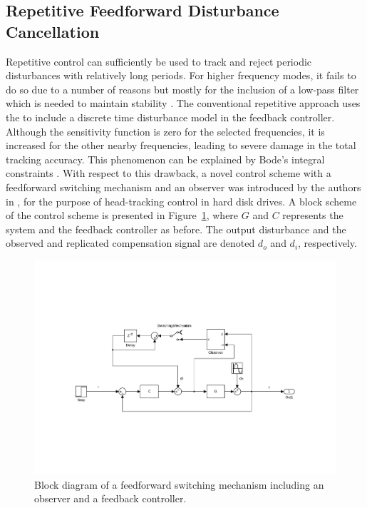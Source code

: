 \subsection{Repetitive Feedforward Disturbance Cancellation}
Repetitive control can sufficiently be used to track and reject periodic disturbances with relatively long periods. For higher frequency modes, it fails to do so due to a number of reasons but mostly for the inclusion of a low-pass filter which is needed to maintain stability \citep{fujimoto2009rro}. The conventional repetitive approach uses the \abbrIMP to include a discrete time disturbance model in the feedback controller. Although the sensitivity function is zero for the selected frequencies, it is increased for the other nearby frequencies, leading to severe damage in the total tracking accuracy. This phenomenon can be explained by Bode's integral constraints \citep{Ljung:2003}. With respect to this drawback, a novel control scheme with a feedforward switching mechanism and an observer was introduced by the authors in \citep{fujimoto2004repetitive}, for the purpose of head-tracking control in hard disk drives. A block scheme of the control scheme is presented in Figure~\ref{fig:ffrep}, where $G$ and $C$ represents the system and the feedback controller as before. The output disturbance and the observed and replicated compensation signal are denoted $d_o$ and $d_i$, respectively.

\begin{figure}[h]
  \centering %
  \includegraphics[width=1\textwidth, trim=6cm 5.5cm 5.2cm 5.5cm, clip=true]{fig/matlab/ffrep}
  \caption{\label{fig:ffrep}Block diagram of a feedforward switching mechanism including an observer and a feedback controller.}
\end{figure}

